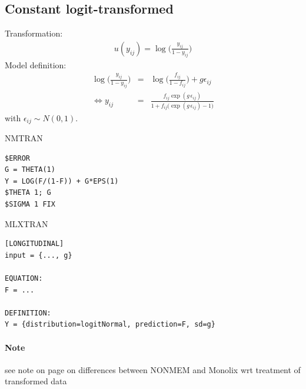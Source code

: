 \subsection{Constant logit-transformed}
\label{model11}

Transformation:
\begin{eqnarray}
u(y_{ij}) = \log\Big(\frac{y_{ij}}{1-y_{ij}}\Big) \nonumber	
\end{eqnarray}
Model definition:
\begin{eqnarray}
\log\Big(\frac{y_{ij}}{1-y_{ij}}\Big) &=& \log\Big(\frac{f_{ij}}{1-f_{ij}}\Big) + g\epsilon_{ij} \nonumber \\
\Longleftrightarrow y_{ij} &=& \frac{f_{ij} \exp(g\,\epsilon_{ij})}{1+f_{ij}\big(\exp(g\,\epsilon_{ij}) - 1\big)} \nonumber
\end{eqnarray}
with $\epsilon_{ij} \sim N(0,1)$.

\bigskip
\begin{lrbox}{\lstbox}\begin{minipage}{16cm}
NMTRAN
\begin{lstlisting}[frame=single,language=NM]
$ERROR
G = THETA(1)
Y = LOG(F/(1-F)) + G*EPS(1)
$THETA 1; G
$SIGMA 1 FIX
\end{lstlisting}   
\end{minipage}\end{lrbox}
\usebox\lstbox

\bigskip
\begin{lrbox}{\lstbox}\begin{minipage}{16cm}
MLXTRAN
\begin{lstlisting}[frame=single,language=MLX]
[LONGITUDINAL]
input = {..., g}

EQUATION:
F = ...

DEFINITION:
Y = {distribution=logitNormal, prediction=F, sd=g}
\end{lstlisting}   
\end{minipage}\end{lrbox}
\usebox\lstbox

\paragraph{Note} see note on page \pageref{noteOnNM} on differences between NONMEM and Monolix
wrt treatment of transformed data


